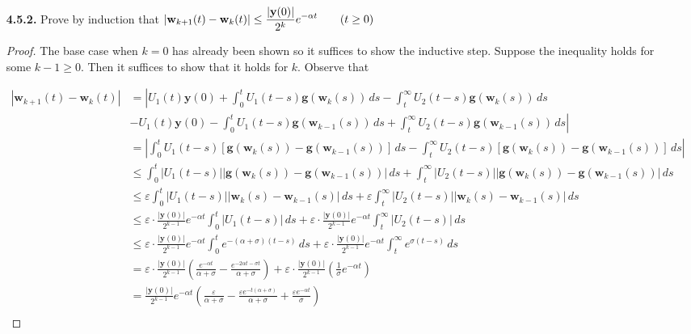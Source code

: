 \documentclass[11pt,oneside,english]{amsart}
\theoremstyle{definition}
\newcommand{\ve}{\varepsilon}
\begin{document}
\begin{enumerate}
\item[\textbf{4.5.2.}] Prove by induction that $\displaystyle |\mathbf{w}_{k+1}(t)-\mathbf{w}_k(t)|\leq\frac{|\mathbf{y}(0)|}{2^k}e^{-\alpha t}\hspace{7mm}(t\geq 0)$


\begin{proof}

The base case when $k=0$ has already been shown so it suffices to show the inductive step. Suppose the inequality holds for some $k-1\geq 0$. Then it suffices to show that it holds for $k$. Observe that

\begin{align*}
|\mathbf{w}_{k+1}(t)-\mathbf{w}_k(t)|&=\left| U_1(t)\mathbf{y}(0)+\int_0^t U_1(t-s)\mathbf{g}(\mathbf{w}_k(s))\,ds-\int_t^\infty U_2(t-s)\mathbf{g}(\mathbf{w}_k(s))\,ds\right.\\[2mm]
&-\left. U_1(t)\mathbf{y}(0)-\int_0^t U_1(t-s)\mathbf{g}(\mathbf{w}_{k-1}(s))\,ds+\int_t^\infty U_2(t-s)\mathbf{g}(\mathbf{w}_{k-1}(s))\,ds\right|\\[2mm]
&=\left|\int_0^tU_1(t-s)[\mathbf{g}(\mathbf{w}_k(s))-\mathbf{g}(\mathbf{w}_{k-1}(s))]\,ds-\int_t^\infty U_2(t-s)[\mathbf{g}(\mathbf{w}_k(s))-\mathbf{g}(\mathbf{w}_{k-1}(s))]\,ds\right|\\[2mm]
&\leq \int_0^t|U_1(t-s)||\mathbf{g}(\mathbf{w}_k(s))-\mathbf{g}(\mathbf{w}_{k-1}(s))|\,ds+\int_t^\infty |U_2(t-s)||\mathbf{g}(\mathbf{w}_k(s))-\mathbf{g}(\mathbf{w}_{k-1}(s))|\,ds\\[2mm]
&\leq \ve\int_0^t|U_1(t-s)||\mathbf{w}_k(s)-\mathbf{w}_{k-1}(s)|\,ds+\ve\int_t^\infty |U_2(t-s)||\mathbf{w}_k(s)-\mathbf{w}_{k-1}(s)|\,ds\\[2mm]
&\leq \ve\cdot \frac{|\mathbf{y}(0)|}{2^{k-1}}e^{-\alpha t}\int_0^t|U_1(t-s)|\,ds+ \ve\cdot \frac{|\mathbf{y}(0)|}{2^{k-1}}e^{-\alpha t}\int_t^\infty |U_2(t-s)|\,ds\\[2mm]
&\leq \ve\cdot \frac{|\mathbf{y}(0)|}{2^{k-1}}e^{-\alpha t}\int_0^te^{-(\alpha+\sigma)(t-s)}\,ds+ \ve\cdot \frac{|\mathbf{y}(0)|}{2^{k-1}}e^{-\alpha t}\int_t^\infty e^{\sigma(t-s)}\,ds\\[2mm]
&= \ve\cdot \frac{|\mathbf{y}(0)|}{2^{k-1}}\left(\frac{e^{-\alpha t}}{\alpha +\sigma}-\frac{e^{-2\alpha t-\sigma t}}{\alpha+\sigma}\right)+ \ve\cdot \frac{|\mathbf{y}(0)|}{2^{k-1}}\left(\frac{1}{\sigma}e^{-\alpha t}\right)\\[2mm]
&=\frac{|\mathbf{y}(0)|}{2^{k-1}}e^{-\alpha t}\left(\frac{\ve}{\alpha+\sigma}-\frac{\ve e^{-t(\alpha +\sigma)}}{\alpha +\sigma}+\frac{\ve e^{-\alpha t}}{\sigma}\right)\\[2mm]

\end{align*}
\end{proof}
\end{enumerate}
\end{document}
